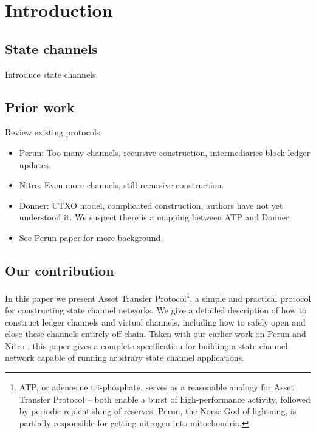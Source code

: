 \section{Introduction}

\subsection{State channels}
Introduce state channels.

\subsection{Prior work}
Review existing protocols
\begin{itemize}
    \item Perun: Too many channels, recursive construction, intermediaries block ledger updates.
    \item Nitro: Even more channels, still recursive construction.
    \item Donner: UTXO model, complicated construction, authors have not yet understood it. We suspect there is a mapping between ATP and Donner.
    \item See Perun paper for more background.
\end{itemize}

\subsection{Our contribution}

In this paper we present Asset Transfer Protocol\footnote{ATP, or adenosine tri-phosphate, serves as a reasonable analogy for Asset Transfer Protocol -- both enable a burst of high-performance activity, followed by periodic replentishing of reserves. Perun, the Norse God of lightning, is partially responsible for getting nitrogen into mitochondria.}, a simple and practical protocol for constructing state channel networks.
We give a detailed description of how to construct ledger channels and virtual channels, including how to safely open and close these channels entirely off-chain.
Taken with our earlier work on Perun and Nitro , this paper gives a complete specification for building a state channel network capable of running arbitrary state channel applications.

